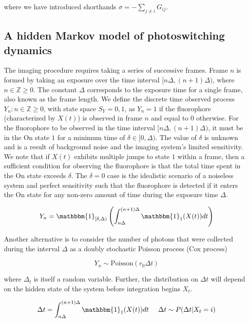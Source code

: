 \documentclass{ucetd}
\begin{document}
where we have introduced shorthands $\sigma = -\sum_{j\neq i}G_{ij}$.

\subsection{A hidden Markov model of photoswitching dynamics}

The imaging procedure requires taking a series of successive frames. Frame $n$ is formed by taking an exposure over the time interval $[n\Delta, (n+1)\Delta)$, where $n\in\mathbb{Z}{\geq0}$. The constant $\Delta$ corresponds to the exposure time for a single frame, also known as the frame length. We define the discrete time observed process ${Y_n: n \in \mathbb{Z}{\geq0}}$, with state space $S_Y={0,1}$, as $Y_n=1$ if the fluorophore (characterized by ${X(t)}$) is observed in frame $n$ and equal to $0$ otherwise. For the fluorophore to be observed in the time interval $[n\Delta, (n+1)\Delta)$, it must be in the On state $1$ for a minimum time of $\delta\in[0,\Delta)$. The value of $\delta$ is unknown and is a result of background noise and the imaging system's limited sensitivity. We note that if ${X(t)}$ exhibits multiple jumps to state $1$ within a frame, then a sufficient condition for observing the fluorophore is that the total time spent in the On state exceeds $\delta$. The $\delta=0$ case is the idealistic scenario of a noiseless system and perfect sensitivity such that the fluorophore is detected if it enters the On state for any non-zero amount of time during the exposure time $\Delta$.

\begin{equation*}
Y_{n} = \mathbbm{1}_{[\delta,\Delta)}\left(\int_{n\Delta}^{(n+1)\Delta} \mathbbm{1}_{1} (X(t)) dt\right)
\end{equation*}

Another alternative is to consider the number of photons that were collected during the interval $\Delta$ as a doubly stochastic Poisson process (Cox process)

\begin{equation*}
Y_{n} \sim \mathrm{Poisson}\left(r_{0}\Delta t\right)
\end{equation*}

where $\Delta_{t}$ is itself a random variable. Further, the distribution on $\Delta t$ will depend on the hidden state of the system before integration begins $X_{t}$. 

\begin{equation*}
\Delta t = \int_{n\Delta}^{(n+1)\Delta} \mathbbm{1}_{1} (X(t)) dt \;\;\;\;\;
\Delta t \sim P(\Delta t | X_{t} = i) 
\end{equation*}
\end{document}
